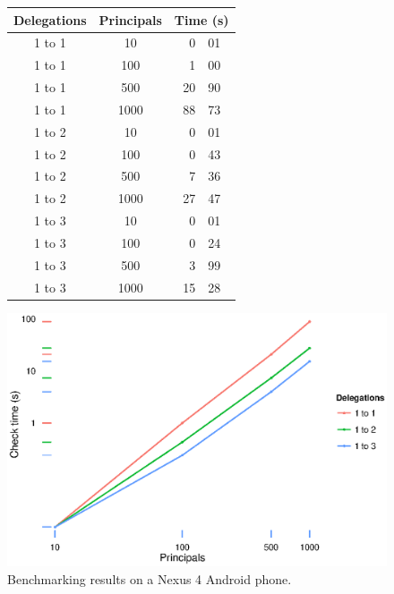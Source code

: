 \documentclass[]{llncs}
\begin{document}
\begin{figure}
  \begin{minipage}{0.40\linewidth}
    \scriptsize
    \begin{tabular*}{0.80\linewidth}{c c r@{.}l}
      \toprule
      Delegations & Principals & \multicolumn{2}{c}{Time (s)} \\
      \midrule
      1 to 1 & 10   &  0&01 \\
      1 to 1 & 100  &  1&00 \\
      1 to 1 & 500  & 20&90 \\
      1 to 1 & 1000 & 88&73 \\
      \midrule
      1 to 2 & 10   &  0&01 \\
      1 to 2 & 100  &  0&43 \\
      1 to 2 & 500  &  7&36 \\
      1 to 2 & 1000 & 27&47 \\
      \midrule
      1 to 3 & 10   &  0&01 \\
      1 to 3 & 100  &  0&24 \\
      1 to 3 & 500  &  3&99 \\
      1 to 3 & 1000 & 15&28 \\
      \bottomrule
    \end{tabular*}
  \end{minipage}
  \begin{minipage}{0.60\linewidth}
    \includegraphics[width=\linewidth]{figures/benchmarks.eps}
  \end{minipage}
  \caption{Benchmarking results on a Nexus 4 Android phone.}
  \label{fig:benchmarks}
\end{figure}
\end{document}
